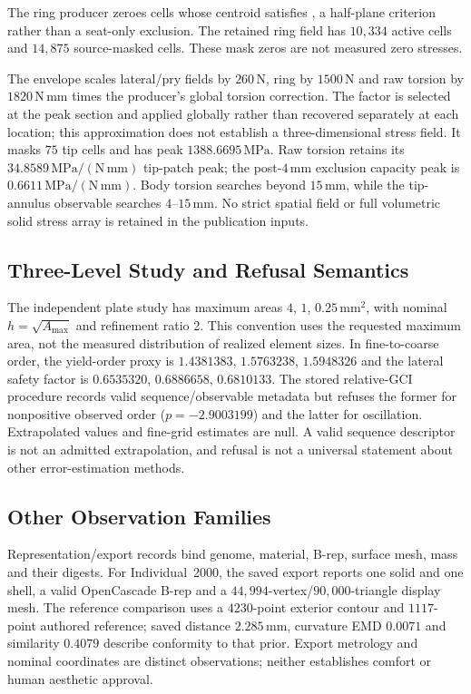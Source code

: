The ring producer zeroes cells whose centroid satisfies , a half-plane criterion rather than a seat-only exclusion. The retained ring field has $10{,}334$ active cells and $14{,}875$ source-masked cells. These mask zeros are not measured zero stresses.

The envelope scales lateral/pry fields by $260\,\mathrm{N}$, ring by $1500\,\mathrm{N}$ and raw torsion by $1820\,\mathrm{N\,mm}$ times the producer's global torsion correction. The factor is selected at the peak section and applied globally rather than recovered separately at each location; this approximation does not establish a three-dimensional stress field. It masks $75$ tip cells and has peak $1388.6695\,\mathrm{MPa}$. Raw torsion retains its $34.8589\,\mathrm{MPa/(N\,mm)}$ tip-patch peak; the post-$4\,\mathrm{mm}$ exclusion capacity peak is $0.6611\,\mathrm{MPa/(N\,mm)}$. Body torsion searches beyond $15\,\mathrm{mm}$, while the tip-annulus observable searches $4$--$15\,\mathrm{mm}$. No strict spatial field or full volumetric solid stress array is retained in the publication inputs.

\subsection{Three-Level Study and Refusal Semantics}
The independent plate study has maximum areas $4$, $1$, $0.25\,\mathrm{mm}^2$, with nominal $h=\sqrt{A_{\max}}$ and refinement ratio 2. This convention uses the requested maximum area, not the measured distribution of realized element sizes. In fine-to-coarse order, the yield-order proxy is $1.4381383$, $1.5763238$, $1.5948326$ and the lateral safety factor is $0.6535320$, $0.6886658$, $0.6810133$. The stored relative-GCI procedure records valid sequence/observable metadata but refuses the former for nonpositive observed order ($p=-2.9003199$) and the latter for oscillation. Extrapolated values and fine-grid estimates are null. A valid sequence descriptor is not an admitted extrapolation, and refusal is not a universal statement about other error-estimation methods.

\subsection{Other Observation Families}
Representation/export records bind genome, material, B-rep, surface mesh, mass and their digests. For Individual~2000, the saved export reports one solid and one shell, a valid OpenCascade B-rep and a $44{,}994$-vertex/$90{,}000$-triangle display mesh. The reference comparison uses a $4230$-point exterior contour and $1117$-point authored reference; saved distance $2.285\,\mathrm{mm}$, curvature EMD $0.0071$ and similarity $0.4079$ describe conformity to that prior. Export metrology and nominal coordinates are distinct observations; neither establishes comfort or human aesthetic approval.

